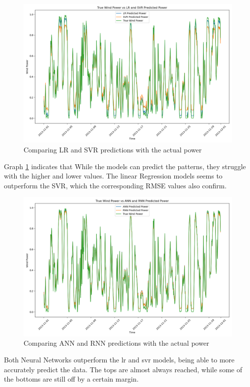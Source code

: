 \documentclass[a4paper, article, oneside, USenglish, IN5460]{memoir}
\begin{document}
\begin{figure}[H]
    \centering
    \includegraphics[width=1\linewidth]{fig/q3-LR-SVR.png}
    \caption{Comparing LR and SVR predictions with the actual power}
    \label{fig:q3-lr-svr}
\end{figure}

Graph \ref{fig:q3-lr-svr} indicates that While the models can predict the patterns, they struggle with the higher and lower values. The linear Regression models seems to outperform the SVR, which the corresponding RMSE values also confirm.


\begin{figure}[H]
    \centering
    \includegraphics[width=1\linewidth]{fig/q3-ANN-RNN.png}
    \caption{Comparing ANN and RNN predictions with the actual power}
    \label{fig:q2-nn}
\end{figure}

Both Neural Networks outperform the lr and svr models, being able to more accurately predict the data. The tops are almost always reached, while some of the bottoms are still off by a certain margin.
\end{document}
